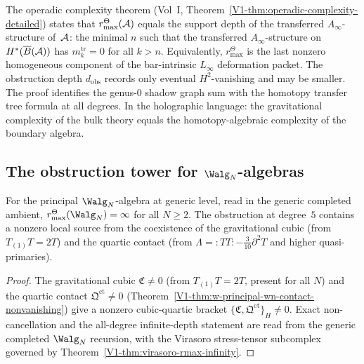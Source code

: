 \begin{remark}
The operadic complexity theorem
(Vol~I, Theorem~\ref*{V1-thm:operadic-complexity-detailed})
states that
\(r^\Theta_{\max}(\mathcal{A})\) equals the support depth of the transferred
\(A_\infty\)-structure of~\(\mathcal{A}\):
the minimal $n$ such that the transferred
$A_\infty$-structure on $H^*(\overline{B}(\mathcal{A}))$ has
$m_k^{\mathrm{tr}} = 0$ for all $k > n$. Equivalently,
\(r^\Theta_{\max}\) is the last nonzero homogeneous component of the
bar-intrinsic \(L_\infty\) deformation packet.  The obstruction depth
\(d_{\mathrm{obs}}\) records only eventual \(H^2\)-vanishing and may
be smaller. The proof identifies the
genus-$0$ shadow graph sum with the homotopy transfer
tree formula at all degrees. In the
holographic language: the gravitational complexity of the
bulk theory equals the homotopy-algebraic complexity of
the boundary algebra.
\end{remark}


\subsection{The obstruction tower for $\Walg_N$-algebras}

\begin{proposition}
For the principal $\Walg_N$-algebra at generic level, read in the
generic completed ambient,
\(r^\Theta_{\max}(\Walg_N) = \infty\) for all $N \geq 2$.
The obstruction at degree~$5$ contains a nonzero local source from
the coexistence of the gravitational cubic
(from $T_{(1)}T = 2T$) and the quartic contact
(from $\Lambda = {:}TT{:} - \frac{3}{10}\partial^2 T$
and higher quasi-primaries).
\end{proposition}

\begin{proof}
The gravitational cubic $\mathfrak{C} \neq 0$ (from
$T_{(1)}T = 2T$, present for all $N$) and the quartic
contact $\mathfrak{Q}^{\mathrm{ct}} \neq 0$
(Theorem~\ref{V1-thm:w-principal-wn-contact-nonvanishing})
give a nonzero cubic-quartic bracket
$\{\mathfrak{C}, \mathfrak{Q}^{\mathrm{ct}}\}_H \neq 0$.
Exact non-cancellation and the all-degree infinite-depth statement are
read from the generic completed $\Walg_N$ recursion, with the Virasoro
stress-tensor subcomplex governed by
Theorem~\ref{V1-thm:virasoro-rmax-infinity}.
\end{proof}

